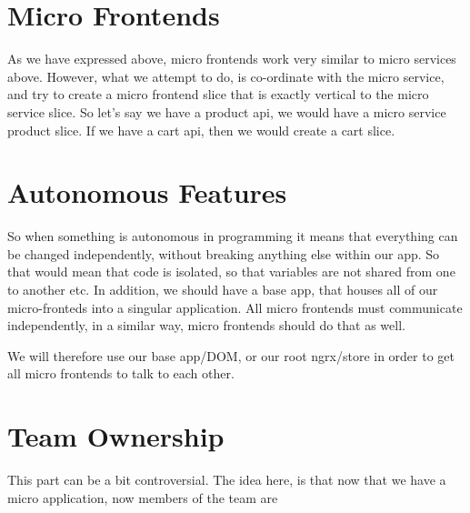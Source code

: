 \section{Micro Frontends}
As we have expressed above, micro frontends work very similar to micro services above. However, what we attempt to do, is co-ordinate with the micro service, and try to create a micro frontend slice that is exactly vertical to the micro service slice. So let's say we have a product api, we would have a micro service product slice. If we have a cart api, then we would create a cart slice. 

\section{Autonomous Features}
So when something is autonomous in programming it means that everything can be changed independently, without breaking anything else within our app. So that would mean that code is isolated, so that variables are not shared from one to another etc. In addition, we should have a base app, that houses all of our micro-fronteds into a singular application. All micro frontends must communicate independently, in a similar way, micro frontends should do that as well. 

We will therefore use our base app/DOM, or our root ngrx/store in order to get all micro frontends to talk to each other. 

\section{Team Ownership}
This part can be a bit controversial. The idea here, is that now that we have a micro application, now members of the team are 